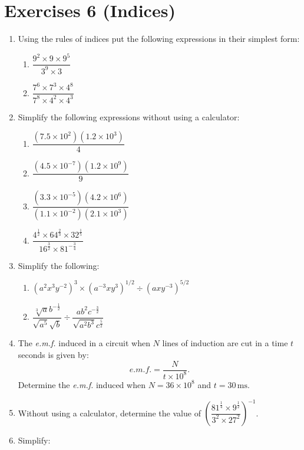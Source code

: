 \documentclass[
  12pt,
  oneside]{book}
\providecommand{\tightlist}{%
  \setlength{\itemsep}{0pt}\setlength{\parskip}{0pt}}
\theoremstyle{definition}
\theoremstyle{definition}
\theoremstyle{definition}
\theoremstyle{definition}
\theoremstyle{remark}
\begin{document}
\chapter*{Exercises 6 (Indices)}\label{exercises-6-indices}

\begin{enumerate}
\def\labelenumi{\arabic{enumi}.}
\item
  Using the rules of indices put the following expressions in their simplest form:

  \begin{enumerate}
  \def\labelenumii{\roman{enumii})}
  \tightlist
  \item
    \(\dfrac{9^2\times 9\times 9^5}{3^9\times 3}\)
  \item
    \(\dfrac{7^6\times 7^3\times 4^8}{7^8\times 4^2\times 4^3}\)
  \end{enumerate}
\item
  Simplify the following expressions without using a calculator:

  \begin{enumerate}
  \def\labelenumii{\roman{enumii})}
  \tightlist
  \item
    \(\dfrac{(7.5\times 10^2)(1.2\times 10^3)}{4}\)
  \item
    \(\dfrac{(4.5\times 10^{-7})(1.2\times 10^9)}{9}\)
  \item
    \(\dfrac{(3.3\times10^{-5})(4.2\times 10^6)}{(1.1\times10^{-2})(2.1\times 10^3)}\)
  \item
    \(\dfrac{4^{\frac12}\times 64^{\frac23}\times 32^{\frac15}}{16^{\frac32}\times 81^{-\frac34}}\)
  \end{enumerate}
\item
  Simplify the following:

  \begin{enumerate}
  \def\labelenumii{\roman{enumii})}
  \tightlist
  \item
    \((a^2 x^3 y^{-2})^3 \times (a^{-3}xy^3)^{1/2}\div (axy^{-3})^{5/2}\)
  \item
    \(\dfrac{\sqrt[3]{a}b^{-\frac12}}{\sqrt{a^5}\sqrt{b}}\div\dfrac{ab^2c^{-\frac32}}{\sqrt{a^2b^3}c^{\frac52}}\)
  \end{enumerate}
\item
  The \emph{e.m.f.} induced in a circuit when \(N\) lines of induction are cut in a time \(t\) seconds is given by:
  \[e.m.f. = \frac{N}{t\times 10^8}.\]
  Determine the \emph{e.m.f.} induced when \(N=36\times 10^8\) and \(t=30\,\mathrm{ms}\).
\item
  Without using a calculator, determine the value of \(\left(\dfrac{81^{\frac14}\times 9^{\frac12}}{3^2\times 27^2}\right)^{-1}\).
\item
  Simplify:


\end{enumerate}
\end{document}
